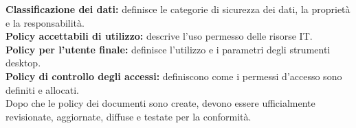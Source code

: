 \textbf{Classificazione dei dati:} definisce le categorie di sicurezza dei dati,
la proprietà e la responsabilità.\\
\newline
\textbf{Policy accettabili di utilizzo:} descrive l'uso permesso delle risorse
IT.\\
\newline
\textbf{Policy per l'utente finale:} definisce l'utilizzo e i parametri degli
strumenti desktop.\\
\newline
\textbf{Policy di controllo degli accessi:} definiscono come i permessi
d'accesso sono definiti e allocati.\\
\newline
Dopo che le policy dei documenti sono create, devono essere ufficialmente
revisionate, aggiornate, diffuse e testate per la conformità.
